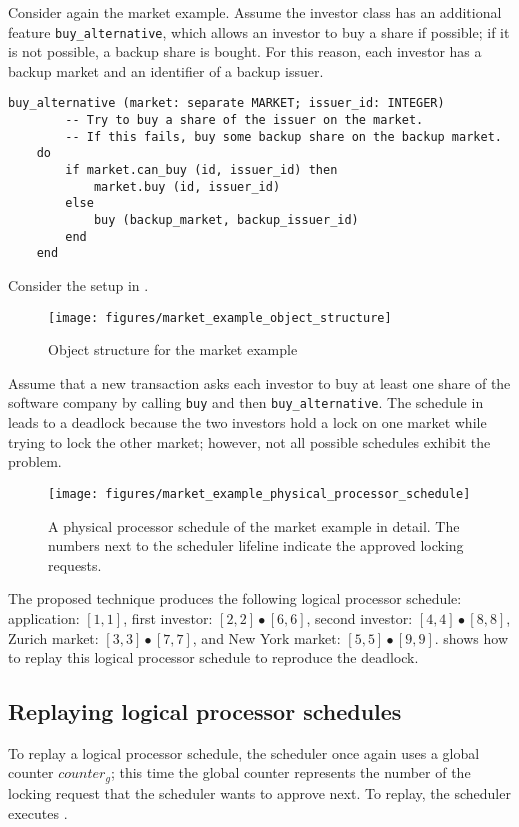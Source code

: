 Consider again the market example. Assume the investor class has an additional feature \lstinline[language=SCOOP]!buy_alternative!, which allows an investor to buy a share if possible; if it is not possible, a backup share is bought. For this reason, each investor has a backup market and an identifier of a backup issuer.
\begin{lstlisting}[language=SCOOP]
buy_alternative (market: separate MARKET; issuer_id: INTEGER)
		-- Try to buy a share of the issuer on the market.
		-- If this fails, buy some backup share on the backup market.
	do
		if market.can_buy (id, issuer_id) then
			market.buy (id, issuer_id)
		else
			buy (backup_market, backup_issuer_id)
		end
	end
\end{lstlisting}
Consider the setup in .
\begin{figure}[ht]
  \centering
  \texttt{[image: figures/market\_example\_object\_structure]}
  \caption{Object structure for the market example}
  \label{fig:market example object structure}
\end{figure}
Assume that a new transaction asks each investor to buy at least one share of the software company by calling \lstinline[language=SCOOP]!buy! and then \lstinline[language=SCOOP]!buy_alternative!. The schedule in  leads to a deadlock because the two investors hold a lock on one market while trying to lock the other market; however, not all possible schedules exhibit the problem.
\begin{figure}[!ht]
  \centering
  \texttt{[image: figures/market\_example\_physical\_processor\_schedule]}
  \caption{A physical processor schedule of the market example in detail. The numbers next to the scheduler lifeline indicate the approved locking requests.}
  \label{fig:market example physical processor schedule}
  \vspace*{1cm}
\end{figure}
The proposed technique produces the following logical processor schedule: application: $[1, 1]$, first investor: $[2, 2] \bullet [6, 6]$, second investor: $[4, 4] \bullet [8, 8]$, Zurich market: $[3, 3] \bullet [7, 7]$, and New York market: $[5, 5] \bullet [9, 9]$.  shows how to replay this logical processor schedule to reproduce the deadlock.


\subsection{Replaying logical processor schedules}\label{sec:replaying logical processor schedules}
To replay a logical processor schedule, the scheduler once again uses a global counter $counter_{g}$; this time the global counter represents the number of the locking request that the scheduler wants to approve next. To replay, the scheduler executes .

